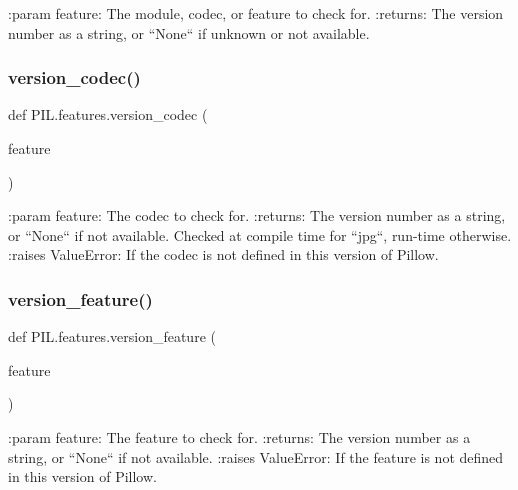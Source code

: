 \begin{DoxyVerb}:param feature:
    The module, codec, or feature to check for.
:returns:
    The version number as a string, or ``None`` if unknown or not available.
\end{DoxyVerb}
 \mbox{\label{namespacePIL_1_1features_a2e27a0a94079654ce3cb41cd1df05468}} 
\subsubsection{\texorpdfstring{version\+\_\+codec()}{version\_codec()}}
{\footnotesize\ttfamily def P\+I\+L.\+features.\+version\+\_\+codec (\begin{DoxyParamCaption}\item[{}]{feature }\end{DoxyParamCaption})}

\begin{DoxyVerb}:param feature: The codec to check for.
:returns:
    The version number as a string, or ``None`` if not available.
    Checked at compile time for ``jpg``, run-time otherwise.
:raises ValueError: If the codec is not defined in this version of Pillow.
\end{DoxyVerb}
 \mbox{\label{namespacePIL_1_1features_a5992f4ca5ff86edcb46bb407e543fbe6}} 
\subsubsection{\texorpdfstring{version\+\_\+feature()}{version\_feature()}}
{\footnotesize\ttfamily def P\+I\+L.\+features.\+version\+\_\+feature (\begin{DoxyParamCaption}\item[{}]{feature }\end{DoxyParamCaption})}

\begin{DoxyVerb}:param feature: The feature to check for.
:returns: The version number as a string, or ``None`` if not available.
:raises ValueError: If the feature is not defined in this version of Pillow.
\end{DoxyVerb}
 \mbox{\label{namespacePIL_1_1features_ad80ee59b0afe3375a4d3ecfa64a44371}} 
